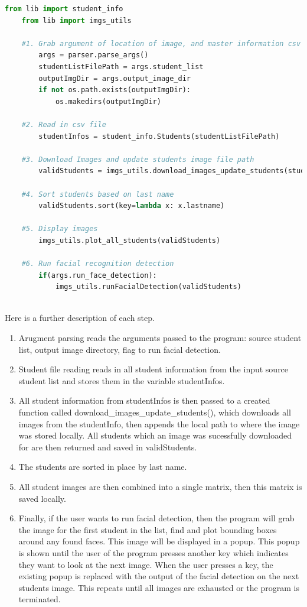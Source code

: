 \documentclass[12pt, letterpaper, final, onecolumn, titlepage] {article}
\begin{document}
\singlespacing
\begin{lstlisting}[language=Python]
	from lib import student_info
	from lib import imgs_utils
	
	#1. Grab argument of location of image, and master information csv
		args = parser.parse_args()
		studentListFilePath = args.student_list
		outputImgDir = args.output_image_dir
		if not os.path.exists(outputImgDir):
			os.makedirs(outputImgDir)

	#2. Read in csv file
		studentInfos = student_info.Students(studentListFilePath)

	#3. Download Images and update students image file path
		validStudents = imgs_utils.download_images_update_students(studentInfos, outputImgDir)

	#4. Sort students based on last name
		validStudents.sort(key=lambda x: x.lastname)

	#5. Display images
		imgs_utils.plot_all_students(validStudents)

	#6. Run facial recognition detection
		if(args.run_face_detection):
			imgs_utils.runFacialDetection(validStudents)
	
\end{lstlisting}
\doublespacing
Here is a further description of each step.
\begin{enumerate}
	\item Arugment parsing reads the arguments passed to the program: source student list, output image directory, flag to run facial detection.
	\item Student file reading reads in all student information from the input source student list and stores them in the variable studentInfos.
	\item All student information from studentInfos is then passed to a created function called download\_images\_update\_students(), which downloads all images from the studentInfo, then appends the local path to where the image was stored locally. All students which an image was sucessfully downloaded for are then returned and saved in validStudents.
	\item The students are sorted in place by last name.
	\item All student images are then combined into a single matrix, then this matrix is saved locally.
	\item Finally, if the user wants to run facial detection, then the program will grab the image for the first student in the list, find and plot bounding boxes around any found faces. This image will be displayed in a popup. This popup is shown until the user of the program presses another key which indicates they want to look at the next image. When the user presses a key, the existing popup is replaced with the output of the facial detection on the next students image. This repeats until all images are exhausted or the program is terminated.
\end{enumerate}
\end{document}
